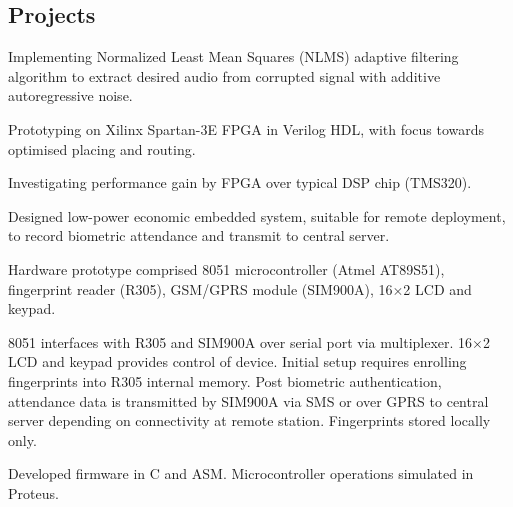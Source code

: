 \documentclass[]{deedy}
\begin{document}
\begin{minipage}[t]{0.72\textwidth}
\begin{flushleft}
\section{Projects}
%
\begin{tightemize}
\item Implementing Normalized Least Mean Squares (NLMS) adaptive filtering algorithm to extract desired audio from corrupted signal with additive autoregressive noise.
\item Prototyping on Xilinx Spartan-3E FPGA in Verilog HDL, with focus towards optimised placing and routing.
\item Investigating performance gain by FPGA over typical DSP chip (TMS320).
\end{tightemize}
\sectionsep
%
\begin{tightemize}
\item
\end{tightemize}
\sectionsep
%
\begin{tightemize}
\item Designed low-power economic embedded system, suitable for remote deployment, to record biometric attendance and transmit to central server.
\item Hardware prototype comprised 8051 microcontroller (Atmel AT89S51), fingerprint reader (R305), GSM/GPRS module (SIM900A), 16$\times$2 LCD and keypad.
\item 8051 interfaces with R305 and SIM900A over serial port via multiplexer. 16$\times$2 LCD and keypad provides control of device. Initial setup requires enrolling fingerprints into R305 internal memory. Post biometric authentication, attendance data is transmitted by SIM900A via SMS or over GPRS to central server depending on connectivity at remote station. Fingerprints stored locally only.
\item Developed firmware in C and ASM. Microcontroller operations simulated in Proteus.
\end{tightemize}
\sectionsep

\end{flushleft}
\end{minipage}
\end{document}
